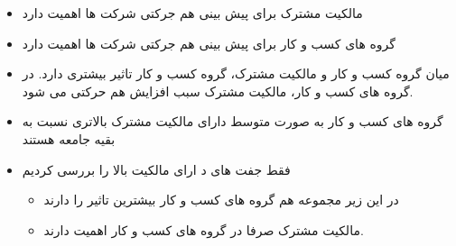 \documentclass[12pt, a4paper]{article}
\begin{document}
\FloatBarrier

\begin{itemize}
\item
مالکیت مشترک برای پیش بینی هم جرکتی شرکت ها اهمیت دارد
\item 
گروه های کسب و کار برای پیش بینی هم جرکتی شرکت ها اهمیت دارد
\item
میان گروه کسب و کار و مالکیت مشترک، گروه  کسب و کار تاثیر بیشتری دارد. در گروه های کسب و کار، مالکیت مشترک سبب افزایش هم حرکتی می شود.
\end{itemize}





\begin{itemize}
\item 
گروه های کسب و کار به صورت متوسط دارای مالکیت مشترک بالاتری نسبت به بقیه جامعه هستند
\item
فقط جفت  های د ارای مالکیت بالا را بررسی کردیم
\begin{itemize}
\item 
در این زیر مجموعه هم گروه های کسب و کار بیشترین تاثیر را دارند 
\item
مالکیت مشترک صرفا در گروه های کسب و کار اهمیت دارند.

\end{itemize}
\end{itemize}

\end{document}
